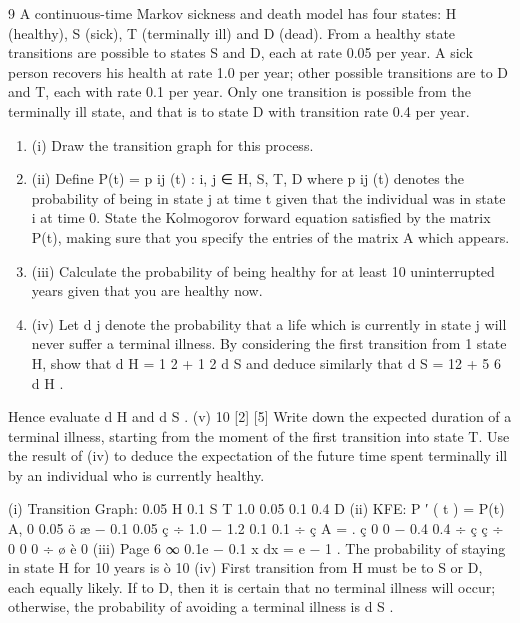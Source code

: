 \documentclass[a4paper,12pt]{article}
\begin{document}
\begin{enumerate}
9
A continuous-time Markov sickness and death model has four states: H (healthy),
S (sick), T (terminally ill) and D (dead). From a healthy state transitions are
possible to states S and D, each at rate 0.05 per year. A sick person recovers his health at rate 1.0 per year; other possible transitions are to D and T, each with
rate 0.1 per year. Only one transition is possible from the terminally ill state, and that is to state D with transition rate 0.4 per year.
\begin{enumerate}
\item (i) Draw the transition graph for this process.
\item (ii) Define P(t) = {p ij (t) : i, j ∈ H, S, T, D} where p ij (t) denotes the probability of being in state j at time t given that the individual was in state i at time 0.
State the Kolmogorov forward equation satisfied by the matrix P(t), making sure that you specify the entries of the matrix A which appears.

\item (iii) Calculate the probability of being healthy for at least 10 uninterrupted years given that you are healthy now.

\item (iv) Let d j denote the probability that a life which is currently in state j will never suffer a terminal illness. By considering the first transition from
1
state H, show that d H = 1 2 + 1 2 d S and deduce similarly that d S = 12
+ 5 6 d H .
\end{enumerate}
Hence evaluate d H and d S .
(v)
10
[2]
[5]
Write down the expected duration of a terminal illness, starting from the moment of the first transition into state T. Use the result of (iv) to deduce
the expectation of the future time spent terminally ill by an individual
who is currently healthy.

(i)
Transition Graph:
0.05
H
0.1
S
T
1.0
0.05
0.1
0.4
D
(ii)
KFE: P ′ ( t ) = P(t) A,
0
0.05 ö
æ − 0.1 0.05
ç
÷
1.0 − 1.2 0.1 0.1 ÷
ç
A =
.
ç 0
0
− 0.4 0.4 ÷
ç ç
÷
0
0
0 ÷ ø
è 0
(iii)
Page 6
∞
0.1e − 0.1 x dx = e − 1 .
The probability of staying in state H for 10 years is ò 10
(iv)
First transition from H must be to S or D, each equally likely. If to D, then it is certain that no terminal illness will occur; otherwise, the probability
of avoiding a terminal illness is d S .


\end{enumerate}
\end{document}
